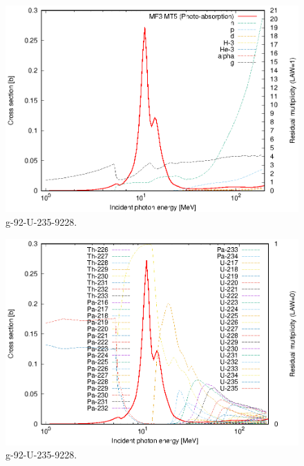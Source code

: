 \begin{figure}
 \includegraphics[width=\linewidth]{eps/g_92-U-235_9228.eps}
  \caption{g-92-U-235-9228.}
\end{figure}
\begin{figure}
 \includegraphics[width=\linewidth]{eps-law0/g_92-U-235_9228.eps}
 \caption{g-92-U-235-9228.}
\end{figure}
\newpage \clearpage

